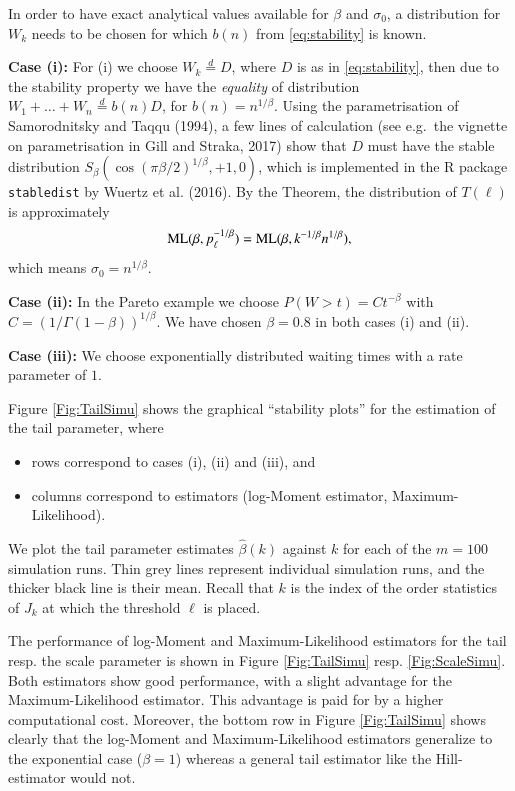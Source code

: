 \documentclass[]{elsarticle} %
\providecommand{\tightlist}{%
  \setlength{\itemsep}{0pt}\setlength{\parskip}{0pt}}
\begin{document}
In order to have exact analytical values available for \(\beta\) and
\(\sigma_0\), a distribution for \(W_k\) needs to be chosen for which
\(b(n)\) from \eqref{eq:stability} is known.

\textbf{Case (i):} For (i) we choose \(W_k \stackrel{d}{=} D\), where
\(D\) is as in \eqref{eq:stability}, then due to the stability property
we have the \emph{equality} of distribution
\(W_1 + \ldots + W_n \stackrel{d}{=} b(n) D\), for
\(b(n) = n^{1/\beta}\). Using the parametrisation of Samorodnitsky and
Taqqu (1994), a few lines of calculation (see e.g.~the vignette on
parametrisation in Gill and Straka, 2017) show that \(D\) must have the
stable distribution \(S_\beta(\cos(\pi \beta/2)^{1/\beta}, +1, 0)\),
which is implemented in the R package \texttt{stabledist} by Wuertz et
al. (2016). By the Theorem, the distribution of \(T(\ell)\) is
approximately \[
{\rm ML}(\beta, p_{\ell}^{-1/\beta}) 
= {\rm ML}(\beta, k^{-1/\beta} n^{1/\beta}),
\] which means \(\sigma_0 = n^{1/\beta}\).

\textbf{Case (ii):} In the Pareto example we choose
\(P(W>t)=Ct^{-\beta}\) with \(C=(1/\Gamma(1-\beta))^{1/\beta}\). We have
chosen \(\beta=0.8\) in both cases (i) and (ii).

\textbf{Case (iii):} We choose exponentially distributed waiting times
with a rate parameter of \(1\).

Figure \ref{Fig:TailSimu} shows the graphical ``stability plots'' for
the estimation of the tail parameter, where

\begin{itemize}
\tightlist
\item
  rows correspond to cases (i), (ii) and (iii), and
\item
  columns correspond to estimators (log-Moment estimator,
  Maximum-Likelihood).
\end{itemize}

We plot the tail parameter estimates \(\hat \beta(k)\) against \(k\) for
each of the \(m=100\) simulation runs. Thin grey lines represent
individual simulation runs, and the thicker black line is their mean.
Recall that \(k\) is the index of the order statistics of \(J_k\) at
which the threshold \(\ell\) is placed.

The performance of log-Moment and Maximum-Likelihood estimators for the
tail resp. the scale parameter is shown in Figure \ref{Fig:TailSimu}
resp. \ref{Fig:ScaleSimu}. Both estimators show good performance, with a
slight advantage for the Maximum-Likelihood estimator. This advantage is
paid for by a higher computational cost. Moreover, the bottom row in
Figure \ref{Fig:TailSimu} shows clearly that the log-Moment and
Maximum-Likelihood estimators generalize to the exponential case
(\(\beta = 1\)) whereas a general tail estimator like the Hill-estimator
would not.
\end{document}
